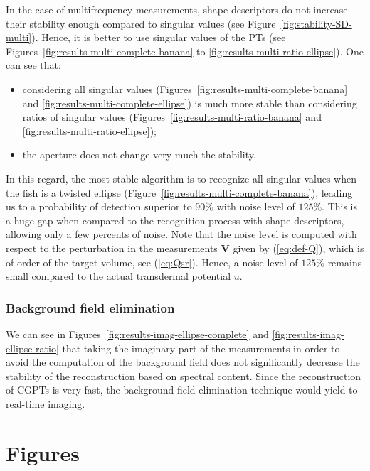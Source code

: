 In the case of multifrequency measurements, shape descriptors do
not increase their stability enough compared to singular values
(see Figure~\ref{fig:stability-SD-multi}). Hence, it is better to
use singular values of the PTs (see
Figures~\ref{fig:results-multi-complete-banana} to
\ref{fig:results-multi-ratio-ellipse}). One can see that:
\begin{itemize}
\item considering all singular values
(Figures~\ref{fig:results-multi-complete-banana} and
\ref{fig:results-multi-complete-ellipse}) is much more stable than
considering ratios of singular values
(Figures~\ref{fig:results-multi-ratio-banana} and
\ref{fig:results-multi-ratio-ellipse}); \item the aperture does
not change very much the stability.
\end{itemize}
In this regard, the most stable algorithm is to recognize all
singular values when the fish is a twisted ellipse
(Figure~\ref{fig:results-multi-complete-banana}), leading us to a
probability of detection superior to $90\%$ with noise level of
$125\%$. This is a huge gap when compared to the recognition
process with shape descriptors, allowing only a few percents of
noise. Note that the noise level is computed with respect to the
perturbation in the measurements $\mathbf{V}$ given by
(\ref{eq:def-Q}), which is of order of the target volume, see
(\ref{eq:Qsr}). Hence, a noise level of $125\%$ remains small
compared to the actual transdermal potential $u$.

\subsubsection{Background field elimination}

We can see in Figures~\ref{fig:results-imag-ellipse-complete} and
\ref{fig:results-imag-ellipse-ratio} that taking the imaginary
part of the measurements in order to avoid the computation of the
background field does not significantly decrease the stability of
the reconstruction based on spectral content. Since the
reconstruction of CGPTs is very fast, the background field
elimination technique would yield to real-time imaging.





\section{Figures}

